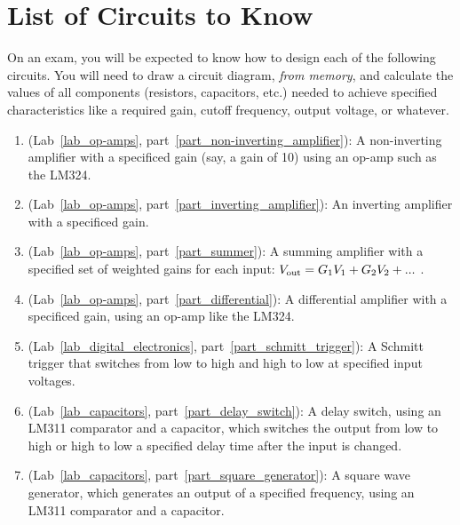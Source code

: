 \section{List of Circuits to Know}
\label{circuits_to_know}

On an exam, you will be expected to know how to design each of the following circuits.  You will need to draw a circuit diagram, \textit{from memory}, and calculate the values of all components (resistors, capacitors, etc.) needed to achieve specified characteristics like a required gain, cutoff frequency, output voltage, or whatever.

\begin{flushleft}
\begin{enumerate}[align=left,leftmargin=*]%

\item (Lab~\ref{lab_op-amps}, part~\ref{part_non-inverting_amplifier}): A non-inverting amplifier with a specificed gain (say, a gain of 10) using an op-amp such as the LM324.

\item (Lab~\ref{lab_op-amps}, part~\ref{part_inverting_amplifier}): An inverting amplifier with a specificed gain.

\item (Lab~\ref{lab_op-amps}, part~\ref{part_summer}): A summing amplifier with a specified set of weighted gains for each input: $V_{\rm out}=G_1V_1 + G_2V_2 + ...$ .

\item (Lab~\ref{lab_op-amps}, part~\ref{part_differential}): A differential amplifier with a specificed gain, using an op-amp like the LM324.

\item (Lab~\ref{lab_digital_electronics}, part~\ref{part_schmitt_trigger}): A Schmitt trigger that switches from low to high and high to low at specified input voltages.

\item (Lab~\ref{lab_capacitors}, part~\ref{part_delay_switch}): A delay switch, using an LM311 comparator and a capacitor, which switches the output from low to high or high to low a specified delay time after the input is changed.

\item (Lab~\ref{lab_capacitors}, part~\ref{part_square_generator}): A square wave generator, which generates an output of a specified frequency, using an LM311 comparator and a capacitor.

\end{enumerate}
\end{flushleft}